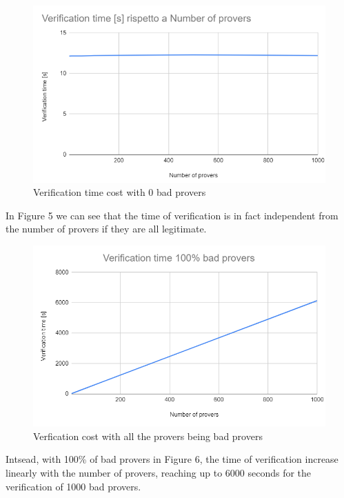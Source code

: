 \documentclass[10pt, a4paper, twocolumn]{article} %
\begin{document}
\begin{figure}
	\includegraphics[width=\linewidth]{images/Verification_0.png} %
	\caption{Verification time cost with 0 bad provers} %
	\label{bear} %
\end{figure}
In Figure 5 we can see that the time of verification is in fact independent from the number of provers if they are all legitimate.\\
\begin{figure}
	\includegraphics[width=\linewidth]{images/verification_100.png} %
	\caption{Verfication cost with all the provers being bad provers} %
	\label{bear} %
\end{figure}
Intsead, with 100\% of bad provers in Figure 6, the time of verification increase linearly with the number of provers, reaching up to 6000 seconds for the verification of 1000 bad provers.\\
\end{document}
